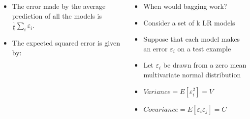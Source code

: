 \begin{frame}
	\begin{columns}
		\begin{overlayarea}{\textwidth}{\textheight}
			\begin{itemize}
				\justifying
				\item <7-> The error made by the average prediction of all the models is $\frac{1}{k}\sum_{i}\varepsilon_i$.
				\item <8-> The expected squared error is given by:
			\end{itemize}
		\end{overlayarea}
		\begin{overlayarea}{\textwidth}{\textheight}
			\begin{itemize}
				\justifying
				\item<1->  When would bagging work?
				\item<2-> Consider a set of k LR models
				\item<3->  Suppose that each model makes an error $\varepsilon_i$ on a test example
				\item<4->  Let $\varepsilon_i$ be drawn from a zero mean multivariate normal distribution
				\item<5->  $ Variance = E[\varepsilon_i^{2}]=V$
				\item<6->  $Covariance = E[\varepsilon_i \varepsilon_j]=C$
			\end{itemize}
		\end{overlayarea}
	\end{columns}
\end{frame}


